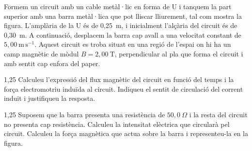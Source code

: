 Formem un circuit amb un cable metàl·lic en forma de U i tanquem la part superior amb una barra metàl·lica que pot lliscar lliurement, tal com mostra la figura. L'amplària de la U és de 0,25~m, i inicialment l'alçària del circuit és de 0,30~m. A continuació, desplacem la barra cap avall a una velocitat constant de $5,00\ \mathrm{m\,s^{-1}}$. Aquest circuit es troba situat en una regió de l'espai on hi ha un camp magnètic de mòdul $B = 2,00\ \mathrm{T}$, perpendicular al pla que forma el circuit i amb sentit cap enfora del paper.


\begin{apartat}{1,25}
Calculeu l'expressió del flux magnètic del circuit en funció del temps i la força electromotriu induïda al circuit. Indiqueu el sentit de circulació del corrent induït i justifiqueu la resposta.
\end{apartat}

\begin{apartat}{1,25}
Suposem que la barra presenta una resistència de $50,0\ \Omega$ i la resta del circuit no presenta cap resistència. Calculeu la intensitat elèctrica que circularà pel circuit. Calculeu la força magnètica que actua sobre la barra i representeu-la en la figura.
\end{apartat}

